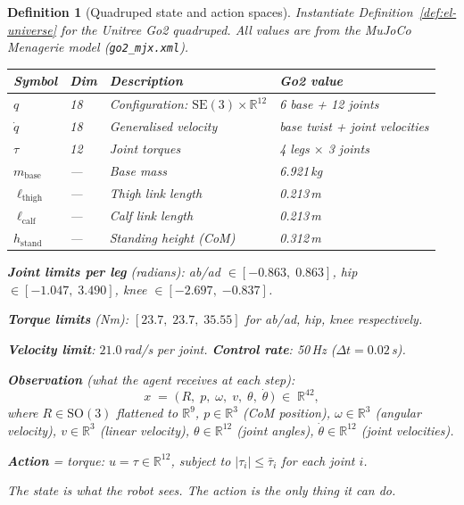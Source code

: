 \documentclass[11pt,a4paper]{article}
\newtheorem{definition}[theorem]{Definition}
\newcommand{\R}{\mathbb{R}}
\begin{document}

\begin{definition}[Quadruped state and action spaces]
\label{def:quadruped-state}
Instantiate Definition~\ref{def:el-universe}
for the Unitree Go2 quadruped.
All values are from the MuJoCo Menagerie model
(\texttt{go2\_mjx.xml}).

\medskip
\begin{center}
\begin{tabular}{@{}llll@{}}
\toprule
\textbf{Symbol} & \textbf{Dim} & \textbf{Description}
  & \textbf{Go2 value} \\
\midrule
$q$ & 18 & Configuration: $\mathrm{SE}(3) \times \R^{12}$
  & 6 base + 12 joints \\
$\dot{q}$ & 18 & Generalised velocity
  & base twist + joint velocities \\
$\tau$ & 12 & Joint torques
  & 4 legs $\times$ 3 joints \\
$m_{\mathrm{base}}$ & --- & Base mass
  & 6.921\,kg \\
$\ell_{\mathrm{thigh}}$ & --- & Thigh link length
  & 0.213\,m \\
$\ell_{\mathrm{calf}}$ & --- & Calf link length
  & 0.213\,m \\
$h_{\mathrm{stand}}$ & --- & Standing height (CoM)
  & 0.312\,m \\
\bottomrule
\end{tabular}
\end{center}

\medskip\noindent
\textbf{Joint limits per leg} (radians):
ab/ad $\in [-0.863,\; 0.863]$,
hip $\in [-1.047,\; 3.490]$,
knee $\in [-2.697,\; {-0.837}]$.

\smallskip\noindent
\textbf{Torque limits} (Nm):
$[23.7,\; 23.7,\; 35.55]$ for ab/ad, hip, knee respectively.

\smallskip\noindent
\textbf{Velocity limit}: $21.0$\,rad/s per joint.
\textbf{Control rate}: 50\,Hz ($\Delta t = 0.02$\,s).

\medskip\noindent
\textbf{Observation} (what the agent receives at each step):
\begin{equation}\label{eq:quadruped-obs}
  x \;=\;
  \bigl(\,
    R,\; p,\; \omega,\; v,\;
    \theta,\; \dot{\theta}
  \,\bigr)
  \;\in\; \R^{42},
\end{equation}
where
$R \in \mathrm{SO}(3)$ flattened to $\R^9$,\;
$p \in \R^3$ (CoM position),\;
$\omega \in \R^3$ (angular velocity),\;
$v \in \R^3$ (linear velocity),\;
$\theta \in \R^{12}$ (joint angles),\;
$\dot{\theta} \in \R^{12}$ (joint velocities).

\medskip\noindent
\textbf{Action} = torque:
$u = \tau \in \R^{12}$,
subject to $|\tau_i| \leq \bar{\tau}_i$
for each joint $i$.

\medskip\noindent
The state is what the robot sees.
The action is the only thing it can do.
\end{definition}
\end{document}
